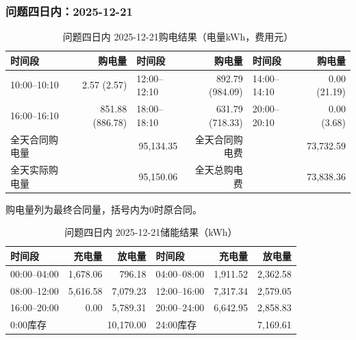 \par\medskip
\par\noindent\begin{minipage}{\textwidth}
\subsubsection*{问题四日内：2025-12-21}
\begin{table}[H]\centering\small\setlength{\tabcolsep}{4pt}\caption{问题四日内 2025-12-21购电结果（电量kWh，费用元）}
\begin{tabular}{lr lr lr}\toprule
时间段 & 购电量 & 时间段 & 购电量 & 时间段 & 购电量\\\midrule
10:00--10:10 & 2.57 (2.57) & 12:00--12:10 & 892.79 (984.09) & 14:00--14:10 & 0.00 (21.19)\\
16:00--16:10 & 851.88 (886.78) & 18:00--18:10 & 631.79 (718.33) & 20:00--20:10 & 0.00 (3.68)\\
\midrule
全天合同购电量 & \multicolumn{2}{r}{95,134.35} & 全天合同购电费 & \multicolumn{2}{r}{73,732.59}\\
全天实际购电量 & \multicolumn{2}{r}{95,150.06} & 全天总购电费 & \multicolumn{2}{r}{73,838.36}\\
\bottomrule\end{tabular}\end{table}
\noindent\small 购电量列为最终合同量，括号内为0时原合同。\normalsize
\begin{table}[H]\centering\small\setlength{\tabcolsep}{4pt}\caption{问题四日内 2025-12-21储能结果（kWh）}
\begin{tabular}{lrr lrr}\toprule
时间段 & 充电量 & 放电量 & 时间段 & 充电量 & 放电量\\\midrule
00:00--04:00 & 1,678.06 & 796.18 & 04:00--08:00 & 1,911.52 & 2,362.58\\
08:00--12:00 & 5,616.58 & 7,079.23 & 12:00--16:00 & 7,317.34 & 2,579.05\\
16:00--20:00 & 0.00 & 5,789.31 & 20:00--24:00 & 6,642.95 & 2,858.83\\
\midrule
0:00库存 & \multicolumn{2}{r}{10,170.00} & 24:00库存 & \multicolumn{2}{r}{7,169.61}\\
\bottomrule\end{tabular}\end{table}
\end{minipage}\par
